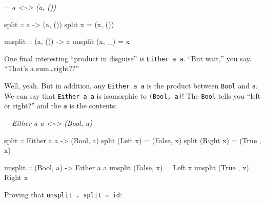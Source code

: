 \documentclass[]{article}
\newenvironment{Shaded}{}{}
\newcommand{\CommentTok}[1]{\textcolor[rgb]{0.38,0.63,0.69}{\textit{#1}}}
\newcommand{\DataTypeTok}[1]{\textcolor[rgb]{0.56,0.13,0.00}{#1}}
\newcommand{\NormalTok}[1]{#1}
\newcommand{\OtherTok}[1]{\textcolor[rgb]{0.00,0.44,0.13}{#1}}
\begin{document}
\begin{Shaded}
\begin{Highlighting}[]
\CommentTok{{-}{-} a \textless{}\textasciitilde{}\textgreater{} (a, ())}

\OtherTok{split ::}\NormalTok{ a }\OtherTok{{-}\textgreater{}}\NormalTok{ (a, ())}
\NormalTok{split x }\OtherTok{=}\NormalTok{ (x, ())}

\OtherTok{unsplit ::}\NormalTok{ (a, ()) }\OtherTok{{-}\textgreater{}}\NormalTok{ a}
\NormalTok{unsplit (x, \_) }\OtherTok{=}\NormalTok{ x}
\end{Highlighting}
\end{Shaded}

One final interesting ``product in disguise'' is \texttt{Either\ a\ a}. ``But
wait,'' you say. ``That's a sum\ldots right??''

Well, yeah. But in addition, any \texttt{Either\ a\ a} is the product between
\texttt{Bool} and \texttt{a}. We can say that \texttt{Either\ a\ a} is
isomorphic to \texttt{(Bool,\ a)}! The \texttt{Bool} tells you ``left or
right?'' and the \texttt{a} is the contents:

\begin{Shaded}
\begin{Highlighting}[]
\CommentTok{{-}{-} Either a a \textless{}\textasciitilde{}\textgreater{} (Bool, a)}

\OtherTok{split ::} \DataTypeTok{Either}\NormalTok{ a a }\OtherTok{{-}\textgreater{}}\NormalTok{ (}\DataTypeTok{Bool}\NormalTok{, a)}
\NormalTok{split (}\DataTypeTok{Left}\NormalTok{  x) }\OtherTok{=}\NormalTok{ (}\DataTypeTok{False}\NormalTok{, x)}
\NormalTok{split (}\DataTypeTok{Right}\NormalTok{ x) }\OtherTok{=}\NormalTok{ (}\DataTypeTok{True}\NormalTok{ , x)}

\OtherTok{unsplit ::}\NormalTok{ (}\DataTypeTok{Bool}\NormalTok{, a) }\OtherTok{{-}\textgreater{}} \DataTypeTok{Either}\NormalTok{ a a}
\NormalTok{unsplit (}\DataTypeTok{False}\NormalTok{, x) }\OtherTok{=} \DataTypeTok{Left}\NormalTok{  x}
\NormalTok{unsplit (}\DataTypeTok{True}\NormalTok{ , x) }\OtherTok{=} \DataTypeTok{Right}\NormalTok{ x}
\end{Highlighting}
\end{Shaded}

Proving that \texttt{unsplit\ .\ split\ =\ id}:
\end{document}

